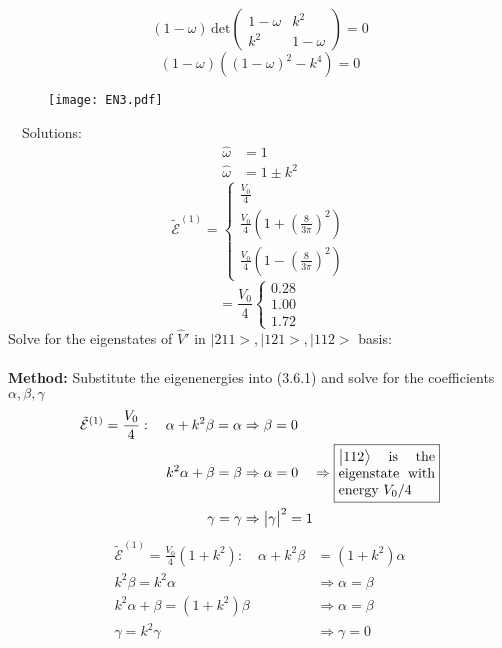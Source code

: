 \documentclass[12pt,fancychapters]{report}
\numberwithin{equation}{section}
\begin{document}
\[
  (1-\omega)\,\text{det}
  \begin{pmatrix}
    1-\omega & k^2\\
    k^2 & 1-\omega
  \end{pmatrix}
  = 0
\]
\[
  (1-\omega)\left((1-\omega)^2 - k^4\right) = 0
\]
\begin{wrapfigure}{l}{7cm}
  \begin{center}
\texttt{[image: EN3.pdf]}
  \end{center}
\end{wrapfigure}
\
\
Solutions:
\begin{align*}
  \hat{\omega} &= 1\\
  \hat{\omega} & = 1 \pm k^2
\end{align*}
\begin{equation}
  \tilde{\mathcal{E}}^{(1)} = 
  \begin{cases}
  \frac{V_0}{4}\\
  \frac{V_0}{4}\left(1+\left(\frac{8}{3\pi}\right)^2\right)\\
\frac{V_0}{4}\left(1-\left(\frac{8}{3\pi}\right)^2\right)
\end{cases}
\end{equation}
\[
 = \frac{V_0}{4}
 \begin{cases}
  0.28\\
  1.00\\
  1.72
  \end{cases}
\]
Solve for the eigenstates of $\hat{V}'$ in {$ \big|211\big>, \big|121\big>, \big|112\big>$} basis:\\
\\
\textbf{Method:} Substitute the eigenenergies into (3.6.1)  and solve for the coefficients 
$\alpha, \beta, \gamma $
\begin{align*}
  \tilde{\mathcal{E}}^{(1)} = \frac{V_0}{4}:  \quad \alpha + k^2 \beta = \alpha &\Rightarrow \beta=0\\
  \quad k^2\alpha+\beta = \beta &\Rightarrow \alpha = 0\quad \Rightarrow \fbox{%
  \parbox{.2\textwidth}{%
  $\big|112\big>$ is the eigenstate with energy $V_0/4$}%
}\\
  \gamma = \gamma & \Rightarrow \big|\gamma\big|^2 = 1
\end{align*}
\begin{align*}
  \tilde{\mathcal{E}}^{(1)}= \frac{V_0}{4}\left(1+k^2\right): \quad 
  \alpha +k^2\beta &= \left(1+k^2\right)\alpha\\
  k^2\beta = k^2\alpha &\Rightarrow \alpha=\beta\\
  k^2\alpha+\beta =\left(1+k^2\right)\beta& \Rightarrow \alpha = \beta\\
  \gamma = k^2\gamma &\Rightarrow \gamma = 0
\end{align*}
\end{document}
